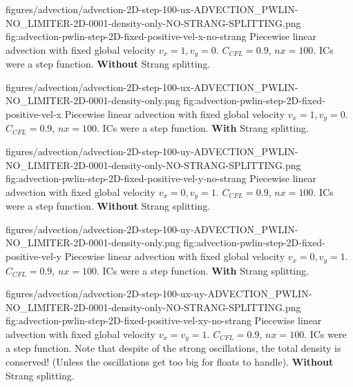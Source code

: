 \quickfigcap
	{figures/advection/advection-2D-step-100-ux-ADVECTION_PWLIN-NO_LIMITER-2D-0001-density-only-NO-STRANG-SPLITTING.png}
	{fig:advection-pwlin-step-2D-fixed-positive-vel-x-no-strang}
	{
		Piecewise linear advection with fixed global velocity $v_x = 1, v_y = 0$. 
		$C_{CFL} = 0.9$, $nx = 100$. 
		ICs were a step function.
		\textbf{Without} Strang splitting.
	}







\quickfigcap
	{figures/advection/advection-2D-step-100-ux-ADVECTION_PWLIN-NO_LIMITER-2D-0001-density-only.png}
	{fig:advection-pwlin-step-2D-fixed-positive-vel-x}
	{
		Piecewise linear advection with fixed global velocity $v_x = 1, v_y = 0$. 
		$C_{CFL} = 0.9$, $nx = 100$. 
		ICs were a step function.
		\textbf{With} Strang splitting.
	}







\quickfigcap
	{figures/advection/advection-2D-step-100-uy-ADVECTION_PWLIN-NO_LIMITER-2D-0001-density-only-NO-STRANG-SPLITTING.png}
	{fig:advection-pwlin-step-2D-fixed-positive-vel-y-no-strang}
	{
		Piecewise linear advection with fixed global velocity $v_x = 0,  v_y = 1$. 
		$C_{CFL} = 0.9$, $nx = 100$. 
		ICs were a step function.
		\textbf{Without} Strang splitting.
	}
	
	





\quickfigcap
	{figures/advection/advection-2D-step-100-uy-ADVECTION_PWLIN-NO_LIMITER-2D-0001-density-only.png}
	{fig:advection-pwlin-step-2D-fixed-positive-vel-y}
	{
		Piecewise linear advection with fixed global velocity $v_x = 0,  v_y = 1$. 
		$C_{CFL} = 0.9$, $nx = 100$. 
		ICs were a step function.
		\textbf{With} Strang splitting.
	}
	
	
	



\quickfigcap
	{figures/advection/advection-2D-step-100-ux-uy-ADVECTION_PWLIN-NO_LIMITER-2D-0001-density-only-NO-STRANG-SPLITTING.png}
	{fig:advection-pwlin-step-2D-fixed-positive-vel-xy-no-strang}
	{	
		Piecewise linear advection with fixed global velocity $v_x = v_y = 1$. $C_{CFL} = 0.9$, $nx = 100$. 
		ICs were a step function. 
		Note that despite of the strong oscillations, the total density is conserved! 
		(Unless the oscillations get too big for floats to handle).
		\textbf{Without} Strang splitting.
	}



